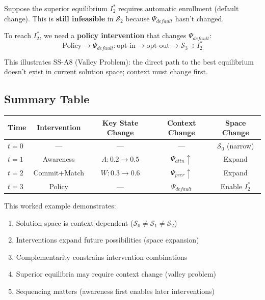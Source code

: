 Suppose the superior equilibrium $I^*_2$ requires automatic enrollment (default change). This is \textbf{still infeasible} in $\mathcal{S}_2$ because $\Psi_{default}$ hasn't changed.

To reach $I^*_2$, we need a \textbf{policy intervention} that changes $\Psi_{default}$:
\begin{equation}
\text{Policy} \to \Psi_{default}: \text{opt-in} \to \text{opt-out} \to \mathcal{S}_3 \ni I^*_2
\end{equation}

This illustrates SS-A8 (Valley Problem): the direct path to the best equilibrium doesn't exist in current solution space; context must change first.

\subsection{Summary Table}

\begin{center}
\begin{tabular}{|l|c|c|c|c|}
\hline
\textbf{Time} & \textbf{Intervention} & \textbf{Key State Change} & \textbf{Context Change} & \textbf{Space Change} \\
\hline
$t=0$ & --- & --- & --- & $\mathcal{S}_0$ (narrow) \\
$t=1$ & Awareness & $A: 0.2 \to 0.5$ & $\Psi_{attn}\uparrow$ & Expand \\
$t=2$ & Commit+Match & $W: 0.3 \to 0.6$ & $\Psi_{peer}\uparrow$ & Expand \\
$t=3$ & Policy & --- & $\Psi_{default}$ & Enable $I^*_2$ \\
\hline
\end{tabular}
\end{center}

This worked example demonstrates:
\begin{enumerate}
    \item Solution space is context-dependent ($\mathcal{S}_0 \neq \mathcal{S}_1 \neq \mathcal{S}_2$)
    \item Interventions expand future possibilities (space expansion)
    \item Complementarity constrains intervention combinations
    \item Superior equilibria may require context change (valley problem)
    \item Sequencing matters (awareness first enables later interventions)
\end{enumerate}

